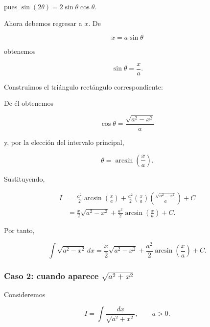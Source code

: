 pues $\sin(2\theta)=2\sin\theta\cos\theta$.

Ahora debemos regresar a $x$. De

\[
x=a\sin\theta
\]

obtenemos

\[
\sin\theta=\frac{x}{a}.
\]

Construimos el triángulo rectángulo correspondiente:

\begin{center}
\end{center}

De él obtenemos

\[
\cos\theta=\frac{\sqrt{a^2-x^2}}{a}
\]

y, por la elección del intervalo principal,

\[
\theta=\arcsin\left(\frac{x}{a}\right).
\]

Sustituyendo,

\begin{align*}
I
&=\frac{a^2}{2}\arcsin\left(\frac{x}{a}\right)
+\frac{a^2}{2}
\left(\frac{x}{a}\right)
\left(\frac{\sqrt{a^2-x^2}}{a}\right)+C\\
&=\frac{x}{2}\sqrt{a^2-x^2}
+\frac{a^2}{2}\arcsin\left(\frac{x}{a}\right)+C.
\end{align*}

Por tanto,

\[
\boxed{
\int\sqrt{a^2-x^2}\,dx
=
\frac{x}{2}\sqrt{a^2-x^2}
+\frac{a^2}{2}\arcsin\left(\frac{x}{a}\right)+C.}
\]

\subsubsection*{Caso 2: cuando aparece \(\sqrt{a^2+x^2}\)}

Consideremos

\[
I=\int\frac{dx}{\sqrt{a^2+x^2}},\qquad a>0.
\]

